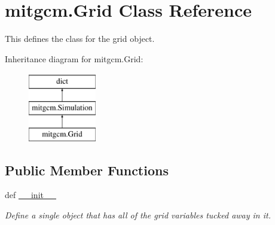 \hypertarget{classmitgcm_1_1Grid}{\section{mitgcm.\+Grid Class Reference}
\label{classmitgcm_1_1Grid}
}


This defines the class for the grid object.  


Inheritance diagram for mitgcm.\+Grid\+:\begin{figure}[H]
\begin{center}
\leavevmode
\includegraphics[height=3.000000cm]{classmitgcm_1_1Grid}
\end{center}
\end{figure}
\subsection*{Public Member Functions}
\begin{DoxyCompactItemize}
\item 
def \hyperlink{classmitgcm_1_1Grid_a156118c888f3135853c7c3c493c03232}{\+\_\+\+\_\+init\+\_\+\+\_\+}
\begin{DoxyCompactList}\small\item\em Define a single object that has all of the grid variables tucked away in it. \end{DoxyCompactList}\end{DoxyCompactItemize}
